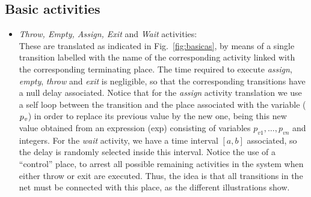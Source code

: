 

\subsection*{Basic activities}
\begin{itemize}
\item {\it Throw, Empty, Assign, Exit} and  {\it Wait} activities:\\
%
These are translated as indicated in \mbox{Fig.\ \ref{fig:basicas}},
by means of a single transition labelled
with the name of the corresponding activity linked with the corresponding terminating place. 
The time required  to execute 
{\it assign}, {\it empty}, {\it throw} and {\it exit} is negligible, so that the 
corresponding transitions have a null delay associated.
Notice that for the {\em assign} activity translation we use
a self loop between the transition and the
place associated with the variable ($p_{\it v}$)
in order to replace its previous value by the new one, being this new value obtained from an expression (exp) consisting of variables $p_{v1},\ldots,p_{vn}$ and integers. For the {\it wait}
activity, we have a time interval $[a,b]$ associated, so the delay is randomly selected
inside this interval. Notice the use of a ``control'' place, to arrest all possible remaining activities in the system when either throw or exit are executed. Thus, the idea is that all transitions in the net must be connected with this place, as the different illustrations show.
\begin{figure}[h]
\centering
{}
\end{figure}
\end{itemize}
